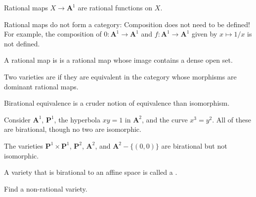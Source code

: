 \documentclass[11pt, oneside,margin=1in]{article}
\begin{document}
\begin{example}[ ]\label{}\text{}
Rational maps $X\longrightarrow \mathbf{A}^1$ are rational functions on $X$.
\end{example}

Rational maps do not form a category: Composition does not need to be defined! For example, the composition of $0:\mathbf{A}^1\longrightarrow \mathbf{A}^1$ and $f:\mathbf{A}^1\longrightarrow \mathbf{A}^1$ given by $x\longmapsto 1/x$ is not defined.

\begin{definition}[ ]\label{}\text{}
A rational map is  is a rational map whose image contains a dense open set.
\end{definition}

\begin{definition}
	Two varieties are  if they are equivalent in the category whose morphisms are dominant rational maps.
\end{definition}

\begin{remark}
	Birational equivalence is a cruder notion of equivalence than isomorphism.
\end{remark}

\begin{example}[ ]\label{}\text{}
Consider $\mathbf{A}^1$, $\mathbf{P}^1 $, the hyperbola $xy=1$ in $\mathbf{A}^2$, and the curve $x^3=y^2$. All of these are birational, though no two are isomorphic.

The varieties $\mathbf{P}^1\times \mathbf{P}^1$, $\mathbf{P}^2$, $\mathbf{A}^2$, and $\mathbf{A}^2-\{(0,0)\}$ are birational but not isomorphic.
\end{example}

\begin{remark}
	A variety that is birational to an affine space is called a .
\end{remark}

\begin{problem}
	Find a non-rational variety.
\end{problem}
\end{document}
